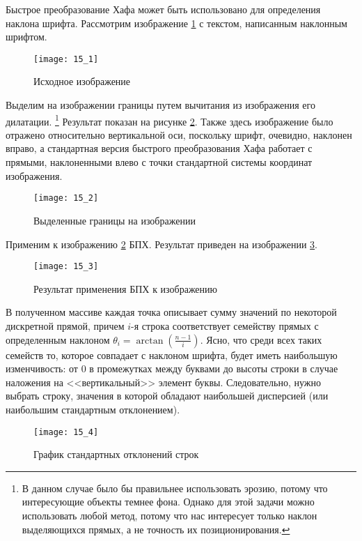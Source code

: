 
Быстрое преобразование Хафа может быть использовано для определения наклона шрифта. Рассмотрим изображение \ref{img:15_1} с текстом, написанным наклонным шрифтом.
\begin{figure}[!h]
    \centering
    \texttt{[image: 15\_1]}
    \caption{Исходное изображение}
    \label{img:15_1}
\end{figure}

Выделим на изображении границы путем вычитания из изображения его дилатации.
\footnote{В данном случае было бы правильнее использовать эрозию, потому что интересующие объекты темнее фона. Однако для этой задачи можно использовать любой метод, потому что нас интересует только наклон выделяющихся прямых, а не точность их позиционирования.}
Результат показан на рисунке \ref{img:15_2}. Также здесь изображение было отражено относительно вертикальной оси, поскольку шрифт, очевидно, наклонен вправо, а стандартная версия быстрого преобразования Хафа работает с прямыми, наклоненными влево с точки стандартной системы координат изображения.
\begin{figure}[!h]
    \centering
    \texttt{[image: 15\_2]}
    \caption{Выделенные границы на изображении}
    \label{img:15_2}
\end{figure}

Применим к изображению \ref{img:15_2} БПХ. Результат приведен на изображении \ref{img:15_3}.
\begin{figure}[!h]
    \centering
    \texttt{[image: 15\_3]}
    \caption{Результат применения БПХ к изображению}
    \label{img:15_3}
\end{figure}

В полученном массиве каждая точка описывает сумму значений по некоторой дискретной прямой, причем $i$-я строка соответствует семейству прямых с определенным наклоном $\theta_i = \arctan\left( \frac{n-1}{i} \right)$. Ясно, что среди всех таких семейств то, которое совпадает с наклоном шрифта, будет иметь наибольшую изменчивость: от 0 в промежутках между буквами до высоты строки в случае наложения на <<вертикальный>> элемент буквы. Следовательно, нужно выбрать строку, значения в которой обладают наибольшей дисперсией (или наибольшим стандартным отклонением).
\begin{figure}[!h]
    \centering
    \texttt{[image: 15\_4]}
    \caption{График стандартных отклонений строк}
    \label{img:15_4}
\end{figure}

